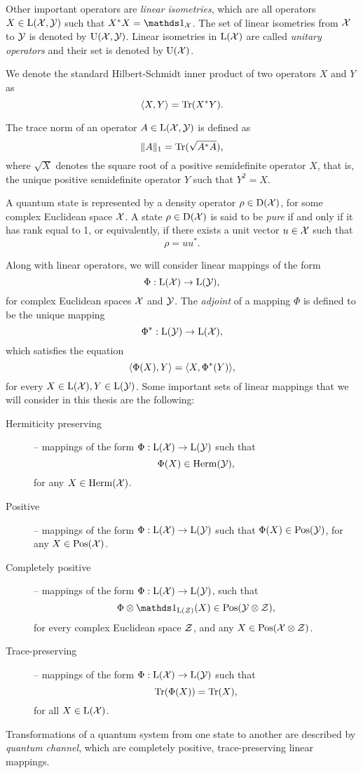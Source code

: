 Other important operators are \emph{linear isometries}, which are all operators
$X\in\mathrm{L}(\mathcal{X},\mathcal{Y})$ such that $X^{\ast}X=\I_{\X}$. The set of linear isometries 
from $\mathcal{X}$ to $\mathcal{Y}$ is denoted by $\mathrm{U}(\mathcal{X},\mathcal{Y})$.
Linear isometries in $\mathrm{L}(\mathcal{X})$ are called \emph{unitary operators} and their 
set is denoted by $\mathrm{U}(\mathcal{X})$.

We denote the standard Hilbert-Schmidt inner product of two operators
$X$ and $Y$ as
\begin{equation}
  \langle X , Y\rangle = \operatorname{Tr}(X^{\ast}Y).
\end{equation}

The trace norm of an operator $A\in\mathrm{L}(\mathcal{X},\mathcal{Y})$ is defined as
\begin{equation}
  \lVert A\rVert_{1} = \operatorname{Tr}(\sqrt{A^{\ast}A}),
\end{equation}
where $\sqrt{X}$ denotes the square root of a positive semidefinite
operator $X$, that is, the unique positive semidefinite operator $Y$ such that $Y^{2} = X$.

A quantum state is represented by a density operator $\rho\in\mathrm{D}(\mathcal{X})$, 
for some complex Euclidean space $\mathcal{X}$. A state $\rho\in\mathrm{D}(\mathcal{X})$ is said 
to be \emph{pure} if and only if it has rank equal to 1, or equivalently, 
if there exists a unit vector $u\in\mathcal{X}$ such that
\[
  \rho = uu^{\ast}.
\]

Along with linear operators, we will consider linear mappings of the form
\[
  \Phi:\mathrm{L}(\mathcal{X}) \rightarrow \mathrm{L}(\mathcal{Y}),
\]
for complex Euclidean spaces $\mathcal{X}$ and $\mathcal{Y}$.
The \emph{adjoint} of a mapping $\Phi$ is defined to be the unique mapping 
\[
  \Phi^{\ast}:\mathrm{L}(\mathcal{Y}) \rightarrow \mathrm{L}(\mathcal{X}),
\]
which satisfies the equation
\begin{equation}
\label{eq:adjoint-map}
  \langle \Phi(X) , Y\rangle = \langle X , \Phi^{\ast}(Y)\rangle,
\end{equation}
for every $X\in\mathrm{L}(\mathcal{X}), Y\in\mathrm{L}(\mathcal{Y})$.
Some important sets of linear mappings that we will consider in this thesis are
the following:
\begin{description}
\item[Hermiticity preserving] -- mappings of the form 
  $\Phi:\mathrm{L}(\mathcal{X})\to\mathrm{L}(\mathcal{Y})$ such that \[\Phi(X) \in \mathrm{Herm}(\mathcal{Y}),\] for any $X\in\mathrm{Herm}(\mathcal{X})$.
\item[Positive] -- mappings of the form 
  $\Phi:\mathrm{L}(\mathcal{X})\to\mathrm{L}(\mathcal{Y})$ such that $\Phi(X) \in \mathrm{Pos}(\mathcal{Y})$, for any $X\in\mathrm{Pos}(\mathcal{X})$.
\item[Completely positive] -- mappings of the form 
  $\Phi:\mathrm{L}(\mathcal{X})\to\mathrm{L}(\mathcal{Y})$, such that 
  \[\Phi\otimes\I_{\Lin(\Z)}(X)\in\Pos(\Y\otimes\Z),\]
  for every complex Euclidean space $\mathcal{Z}$, and any $X\in\mathrm{Pos}(\mathcal{X}\otimes\mathcal{Z})$.
\item[Trace-preserving] -- mappings of the form
  $\Phi:\mathrm{L}(\mathcal{X})\to\mathrm{L}(\mathcal{Y})$ such that 
  \[ \operatorname{Tr}(\Phi(X)) = \operatorname{Tr}(X),\] 
  for all $X\in\mathrm{L}(\mathcal{X})$.
\end{description}
Transformations of a quantum system from one state to another are described by 
\emph{quantum channel}, which are completely positive, trace-preserving linear mappings.

